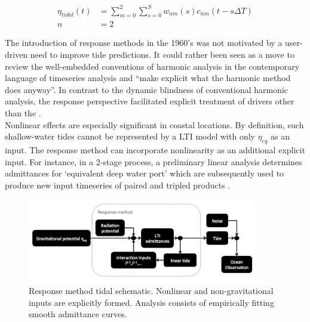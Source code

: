 \begin{align}
\label{E:lags}
\eta_{tidal}(t) &= \sum_{m=0}^{2}\sum_{s=0}^{S} w_{nm}(s)c_{nm}(t-s\Delta T)\\
              n &= 2   \nonumber
\end{align}

The introduction of response methods in the 1960's was not motivated by a user-driven need to improve tide predictions.  It could rather been seen as a move to review the well-embedded conventions of harmonic analysis in the contemporary language of timeseries analysis and ``make explicit what the harmonic method does anyway''\citep[pp 540]{Munk:1966ts}.  In contrast to the dynamic blindness of conventional harmonic analysis, the response perspective facilitated explicit treatment of drivers other than the \ATGP{}.\\

Nonlinear effects are especially significant in coastal locations.   By definition, such shallow-water tides cannot be represented by a LTI model with only $\eta_{eq}$ as an input.  The response method can incorporate nonlinearity as an additional explicit input.    For instance,  in a 2-stage process, a preliminary linear analysis determines admittances for `equivalent deep water port' which are subsequently used to produce new input timeseries of paired and tripled products \citep[pp 122]{Pugh:1996uz}.\\

\begin{figure}[h]
\begin{center}
\includegraphics[width=100mm]{figures/response_analysis_flowchart.png}
\caption{Response method tidal schematic.  Nonlinear and non-gravitational inputs are explicitly formed.   Analysis consists of empirically fitting smooth admittance curves.}
\label{fig:response}
\end{center}
\end{figure}

